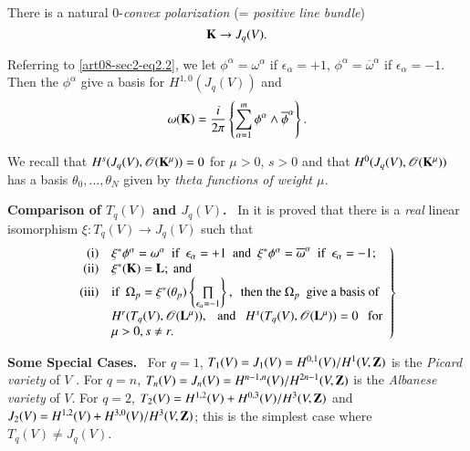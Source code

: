 There is a natural $0$-{\em convex polarization} (= {\em positive line bundle})
\begin{equation}
\mathbf{K}\to J_{q}(V).\label{art08-sec2-eq2.4}
\end{equation}

Referring to \eqref{art08-sec2-eq2.2}, we let $\phi^{\alpha}=\omega^{\alpha}$ if $\epsilon_{\alpha}=+1$, $\phi^{\alpha}=\overline{\omega}^{\alpha}$ if $\epsilon_{\alpha}=-1$. Then the $\phi^{\alpha}$ give a basis for $H^{1,0}(J_{q}(V))$ and
\begin{equation}
\omega (\mathbf{K})=\dfrac{i}{2\pi}\left\{\sum\limits^{m}_{\alpha=1}\phi^{\alpha}\wedge \overline{\phi}^{\alpha}\right\}.\label{art08-sec2-eq2.5}
\end{equation}

We recall \cite{art08-key23} that $H^{s}(J_{q}(V),\mathscr{O}(\mathbf{K}^{\mu}))=0$ for $\mu>0$, $s>0$ and that $H^{0}(J_{q}(V),\mathscr{O}(\mathbf{K}^{\mu}))$ has a basis $\theta_{0},\ldots,\theta_{N}$ given by {\em theta functions of weight $\mu$.}

\medskip
\noindent
{\bf Comparison of $T_{q}(V)$ and $J_{q}(V)$.}~ In \cite{art08-key9} it is proved that there is a {\em real} linear isomorphism $\xi:T_{q}(V)\to J_{q}(V)$ such that
\begin{equation}
\left.
\begin{array}[l]{@{}rl}
{\rm(i)} & \xi^{*}\phi^{\alpha}=\omega^{\alpha}\text{~ if~ } \epsilon_{\alpha}=+1\text{~ and~ } \xi^{*}\phi^{\alpha}=\overline{\omega}^{\alpha}\text{~ if~ } \epsilon_{\alpha}=-1;\\
{\rm(ii)} & \xi^{*}(\bfK)=\bfL;~ \text{and}\\
{\rm(iii)} & \text{if~~} \Omega_{p}=\xi^{*}(\theta_{p})\left\{\prod\limits_{\epsilon_{\alpha}=-1}\right\}, \text{~ then the } \Omega_{p}\text{~ give a basis of}\\
 & H^{r}(T_{q}(V),\mathscr{O}(\bfL^{\mu})),\text{~~ and~~ }H^{s}(T_{q}(V),\mathscr{O}(\bfL^{\mu}))=0\text{~~ for}\\
& \mu>0, s\neq r.
\end{array}
\right\}\label{art08-sec2-eq2.6}
\end{equation}

\noindent
{\bf Some Special Cases.}~ For $q=1$, $T_{1}(V)=J_{1}(V)=H^{0,1}(V)/H^{1}(V,\mathbf{Z})$ is the {\em Picard variety} of $V$ \cite{art08-key22}. For $q=n$, $T_{n}(V)=J_{n}(V)=H^{n-1,n}(V)\break /H^{2n-1}(V,\bfZ)$ is the {\em Albanese variety} \cite{art08-key3} of $V$. For $q=2$, $T_{2}(V)=H^{1,2}(V)+H^{0,3}(V)/H^{3}(V,\mathbf{Z})$ and $J_{2}(V)=H^{1,2}(V)+H^{3,0}(V)/H^{3}(V,\mathbf{Z})$; this is the simplest case where $T_{q}(V)\neq J_{q}(V)$.

